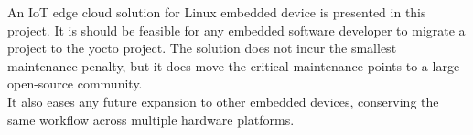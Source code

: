 \documentclass[../../main.tex]{subfiles}
\begin{document}
An IoT edge cloud solution for Linux embedded device is presented in this project.
It is should be feasible for any embedded software developer to migrate a project to the yocto
project.
The solution does not incur the smallest maintenance penalty, but it does move the critical 
maintenance points to a large open-source community.\\

It also eases any future expansion to other embedded devices, conserving the same workflow across
multiple hardware platforms.

	
\end{document}
